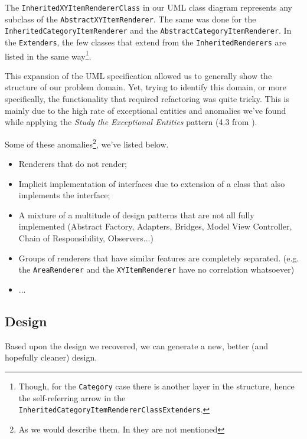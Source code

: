 \documentclass[11pt]{article}
\begin{document}
	The \texttt{InheritedXYItemRendererClass} in our UML class diagram represents any subclass of the \texttt{AbstractXYItemRenderer}. The same was done for the \texttt{InheritedCategoryItemRenderer} and the \texttt{AbstractCategoryItemRenderer}. In the \texttt{Extenders}, the few classes that extend from the \texttt{InheritedRenderers} are listed in the same way\footnote{Though, for the \texttt{Category} case there is another layer in the structure, hence the self-referring arrow in the \texttt{InheritedCategoryItemRendererClassExtenders}.}.
	
	This expansion of the UML specification allowed us to generally show the structure of our problem domain. Yet, trying to identify this domain, or more specifically, the functionality that required refactoring was quite tricky. This is mainly due to the high rate of exceptional entities and anomalies we've found while applying the \textsl{Study the Exceptional Entities} pattern (4.3 from \cite{demeyer2009object}).
	
	Some of these anomalies\footnote{As we would describe them. In \cite{demeyer2009object} they are not mentioned}, we've listed below.
	\begin{itemize}
		\item Renderers that do not render;
		\item Implicit implementation of interfaces due to extension of a class that also implements the interface;
		\item A mixture of a multitude of design patterns that are not all fully implemented (Abstract Factory, Adapters, Bridges, Model View Controller, Chain of Responsibility, Observers...)
		\item Groups of renderers that have similar features are completely separated. (e.g. the \texttt{AreaRenderer} and the \texttt{XYItemRenderer} have no correlation whatsoever)
		\item ...
	\end{itemize}

	\subsection{Design}
	Based upon the design we recovered, we can generate a new, better (and hopefully cleaner) design.
	
\end{document}
